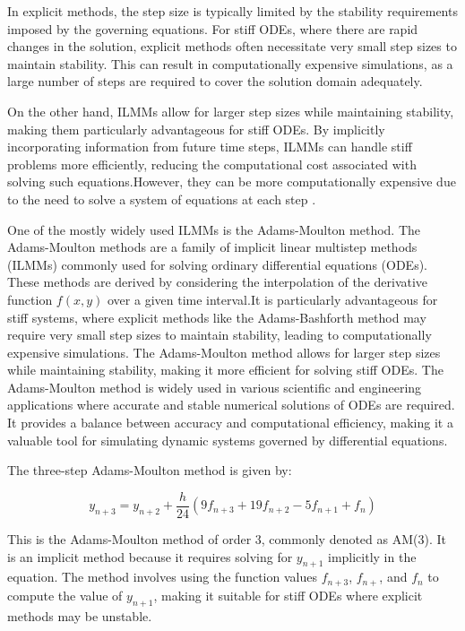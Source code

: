 In explicit methods, the step size is typically limited by the stability requirements imposed by the governing equations. For stiff ODEs, where there are rapid changes in the solution, explicit methods often necessitate very small step sizes to maintain stability. This can result in computationally expensive simulations, as a large number of steps are required to cover the solution domain adequately.

On the other hand, ILMMs allow for larger step sizes while maintaining stability, making them particularly advantageous for stiff ODEs. By implicitly incorporating information from future time steps, ILMMs can handle stiff problems more efficiently, reducing the computational cost associated with solving such equations.However, they can be more computationally expensive due to the need to solve a system of equations at each step \cite{thohura2013numerical}.

One of the mostly widely used ILMMs is the Adams-Moulton method. The Adams-Moulton methods are a family of implicit linear multistep methods (ILMMs) commonly used for solving ordinary differential equations (ODEs). These methods are derived by considering the interpolation of the derivative function $f(x,y)$ over a given time interval.It is particularly advantageous for stiff systems, where explicit methods like the Adams-Bashforth method may require very small step sizes to maintain stability, leading to computationally expensive simulations. The Adams-Moulton method allows for larger step sizes while maintaining stability, making it more efficient for solving stiff ODEs.
The Adams-Moulton method is widely used in various scientific and engineering applications where accurate and stable numerical solutions of ODEs are required. It provides a balance between accuracy and computational efficiency, making it a valuable tool for simulating dynamic systems governed by differential equations.

The three-step Adams-Moulton method is given by:


\begin{equation}
  y_{n+3} = y_{n+2} + \frac{h}{24} \left( 9 f_{n+3} + 19 f_{n+2} - 5 f_{n+1} + f_{n} \right)
\end{equation}


This is the Adams-Moulton method of order 3, commonly denoted as AM(3). It is an implicit method because it requires solving for \( y_{n+1} \) implicitly in the equation. The method involves using the function values \( f_{n+3} \), \( f_{n+} \), and \( f_n \) to compute the value of \( y_{n+1} \), making it suitable for stiff ODEs where explicit methods may be unstable.


